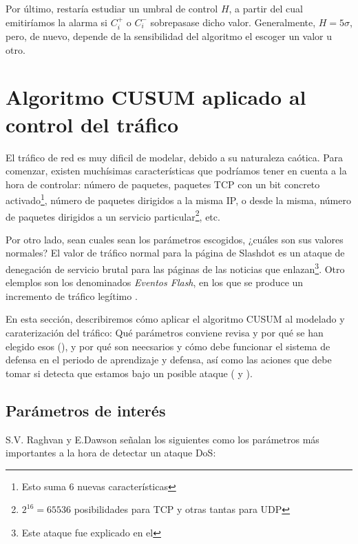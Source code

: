 Por último, restaría estudiar un umbral de control $H$, a partir del cual emitiríamos la 
alarma si $C_i^+$ o $C_i^-$ sobrepasase dicho valor. Generalmente, $H=5\sigma$, pero, de nuevo, depende de la 
sensibilidad del algoritmo el escoger un valor u otro.

\section{Algoritmo CUSUM aplicado al control del tráfico}
El tráfico de red es muy dificil de modelar, debido a su naturaleza caótica. Para comenzar, existen muchísimas 
características que podríamos tener en cuenta a la hora de controlar: número de paquetes, paquetes TCP con un bit 
concreto activado\footnote{Esto suma 6 nuevas características}, número de paquetes dirigidos a la misma IP, o desde la 
misma, número de paquetes dirigidos a un servicio particular\footnote{$2^{16}=65536$ posibilidades para TCP y otras 
tantas para UDP}, etc. 

Por otro lado, sean cuales sean los parámetros escogidos, ¿cuáles son sus valores normales? El valor de tráfico normal 
para la página de Slashdot es un ataque de denegación de servicio brutal para las páginas de las noticias que 
enlazan\footnote{Este ataque fue explicado en el }. Otro elemplos son los denominados 
\emph{Eventos Flash}, en los que se produce un incremento de tráfico legítimo \cite{Raghavan}.

En esta sección, describiremos cómo aplicar el algoritmo CUSUM al modelado y caraterización del tráfico: Qué parámetros 
conviene revisa y por qué se han elegido esos (), y por qué son neecsarios y cómo debe 
funcionar el sistema de defensa en el periodo de aprendizaje y defensa, así como las aciones que debe tomar si detecta 
que estamos bajo un posible ataque ( y ).

\subsection{Parámetros de interés}
S.V. Raghvan y E.Dawson señalan los siguientes como los parámetros más importantes a la hora de detectar un ataque 
\gls{DoS}:

